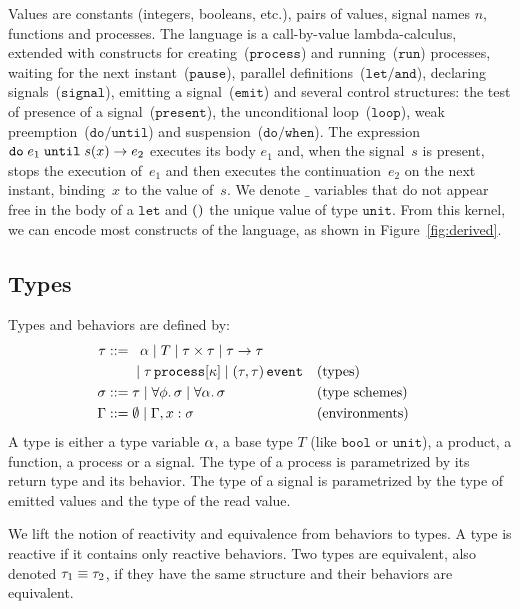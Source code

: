 \documentclass[9pt,preprint]{sigplanconf}
\newcommand{\sdeq}{::=}
\begin{document}
Values are constants (integers, booleans, etc.), pairs of values, signal names $n$, functions and processes. The language is a call-by-value lambda-calculus, extended with constructs for creating~($\mathtt{process}$) and running~($\mathtt{run}$) processes, waiting for the next instant~($\mathtt{pause}$), parallel definitions~($\mathtt{let/and}$), declaring signals~($\mathtt{signal}$), emitting a signal~($\mathtt{emit}$) and several control structures: the test of presence of a signal~($\mathtt{present}$), the unconditional loop~($\mathtt{loop}$), weak preemption~($\mathtt{do/until}$) and suspension~($\mathtt{do/when}$).  The expression $\mathtt{do}\; e_1 \;\mathtt{until}\; s(x) \rightarrow e_2$ executes its body $e_1$ and, when the signal~$s$ is present, stops the execution of~$e_1$ and then executes the continuation~$e_2$ on the next instant, binding~$x$ to the value of~$s$. We denote $\_$ variables that do not appear free in the body of a $\mathtt{let}$ and $\mathtt{()}{}$ the unique value of type $\mathtt{unit}$. From this kernel, we can encode most constructs of the language, as shown in Figure~\ref{fig:derived}.

\subsection{Types}

Types and behaviors are defined by:
\begin{align*}
\rt \sdeq &\;\;\; \rtvar \mid T \mid \rtprod{\rt}{\rt} \mid \rtarrow{\rt}{\rt} \\
    &\;\mid \rtproc{\rt}{\rk} \mid \rtsig{\rt}{\rt} && \text{(types)} \\
\rs \sdeq &\; \rt \mid \forall \effvar.\, \rs \mid \forall \rtvar.\, \rs && \text{(type schemes)} \\
\tyenv \sdeq&\; \emptyset \mid \tyenv \tyconcat x : \rs && \text{(environments)}
\end{align*}
A type is either a type variable $\alpha$, a base type $T$ (like $\mathtt{bool}$ or $\mathtt{unit}$), a product, a function, a process or a signal. The type of a process is parametrized by its return type and its behavior. The type of a signal is parametrized by the type of emitted values and the type of the read value.

We lift the notion of reactivity and equivalence from behaviors to types. A type is reactive if it contains only reactive behaviors. Two types are equivalent, also denoted $\tau_1 \equiv \tau_2$, if they have the same structure and their behaviors are equivalent.
\end{document}
